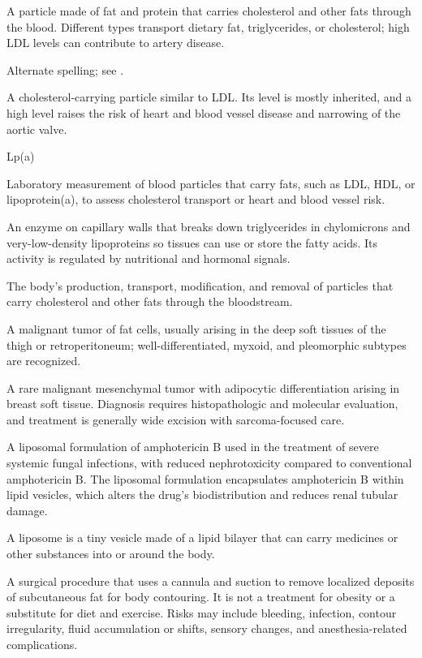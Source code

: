  A particle made of fat and protein that carries cholesterol and other fats through the blood. Different types transport dietary fat, triglycerides, or cholesterol; high LDL levels can contribute to artery disease.

 Alternate spelling; see .

 A cholesterol-carrying particle similar to LDL. Its level is mostly inherited, and a high level raises the risk of heart and blood vessel disease and narrowing of the aortic valve.

\synonyms
Lp(a)

 Laboratory measurement of blood particles that carry fats, such as LDL, HDL, or lipoprotein(a), to assess cholesterol transport or heart and blood vessel risk.

 An enzyme on capillary walls that breaks down triglycerides in chylomicrons and very-low-density lipoproteins so tissues can use or store the fatty acids. Its activity is regulated by nutritional and hormonal signals.

 The body's production, transport, modification, and removal of particles that carry cholesterol and other fats through the bloodstream.

 A malignant tumor of fat cells, usually arising in the deep soft tissues of the thigh or
retroperitoneum; well-differentiated, myxoid, and pleomorphic subtypes are recognized.

 A rare malignant mesenchymal tumor with adipocytic differentiation arising in breast soft tissue. Diagnosis requires histopathologic and molecular evaluation, and treatment is generally wide excision with sarcoma-focused care.

 A liposomal formulation of amphotericin B used in the treatment of severe systemic
fungal infections, with reduced nephrotoxicity compared to conventional amphotericin B.
The liposomal formulation encapsulates amphotericin B within lipid vesicles, which
alters the drug's biodistribution and reduces renal tubular damage.

 A liposome is a tiny vesicle made of a lipid bilayer that can carry medicines or other substances into or around the body.

 A surgical procedure that uses a cannula and suction to remove localized deposits of subcutaneous fat for body contouring. It is not a treatment for obesity or a substitute for diet and exercise. Risks may include bleeding, infection, contour irregularity, fluid accumulation or shifts, sensory changes, and anesthesia-related complications.

